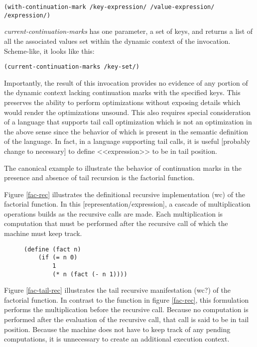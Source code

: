 \documentclass[ms]{byuprop}
\begin{document}
\begin{verbatim}
(with-continuation-mark /key-expression/ /value-expression/ /expression/)
\end{verbatim}

\emph{current-continuation-marks} has one parameter, a set of keys, and returns a list of all the associated values set within the dynamic context of the invocation. Scheme-like, it looks like this:

\begin{verbatim}
(current-continuation-marks /key-set/)
\end{verbatim}

Importantly, the result of this invocation provides no evidence of any portion of the dynamic context lacking continuation marks with the specified keys. This preserves the ability to perform optimizations without exposing details which would render the optimizations unsound. This also requires special consideration of a language that supports tail call optimization which is not an optimization in the above sense since the behavior of which is present in the semantic definition of the language. In fact, in a language supporting tail calls, it is useful [probably change to necessary] to define <<expression>> to be in tail position.

The canonical example to illustrate the behavior of continuation marks in the presence and absence of tail recursion is the factorial function.

Figure \ref{fac-rec} illustrates the definitional recursive implementation (wc) of the factorial function. In this [representation/expression], a cascade of multiplication operations builds as the recursive calls are made. Each multiplication is computation that must be performed after the recursive call of which the machine must keep track.


\begin{figure}
\begin{verbatim}
(define (fact n)
    (if (= n 0)
        1
        (* n (fact (- n 1))))
\end{verbatim}
\end{figure}

Figure \ref{fac-tail-rec} illustrates the tail recursive manifestation (wc?) of the factorial function. In contrast to the function in figure \ref{fac-rec}, this formulation performs the multiplication before the recursive call. Because no computation is performed after the evaluation of the recursive call, that call is said to be in tail position. Because the machine does not have to keep track of any pending computations, it is unnecessary to create an additional execution context.
\end{document}
